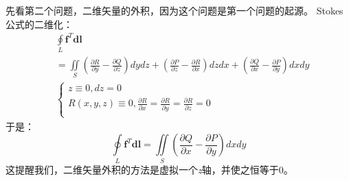 先看第二个问题，二维矢量的外积，因为这个问题是第一个问题的起源。
Stokes公式的二维化：
\begin{align*}
&\oint\limits_L{\boldsymbol{f}^T\boldsymbol{dl}} \\
&=\iint\limits_S{\left( \frac{\partial R}{\partial y}-\frac{\partial Q}{\partial z} \right) dydz+\left( \frac{\partial P}{\partial z}-\frac{\partial R}{\partial x} \right) dzdx+\left( \frac{\partial Q}{\partial x}-\frac{\partial P}{\partial y} \right) dxdy} \\
&\begin{cases}
	z\equiv 0,dz=0\\
	R\left( x,y,z \right) \equiv 0,\frac{\partial R}{\partial x}=\frac{\partial R}{\partial y}=\frac{\partial R}{\partial z}=0\\
\end{cases}
\end{align*}
于是：
\[
\oint\limits_L{\boldsymbol{f}^T\boldsymbol{dl}}=\iint\limits_S{\left( \frac{\partial Q}{\partial x}-\frac{\partial P}{\partial y} \right) dxdy}
\]
这提醒我们，二维矢量外积的方法是虚拟一个{\it z}轴，并使之恒等于0。

